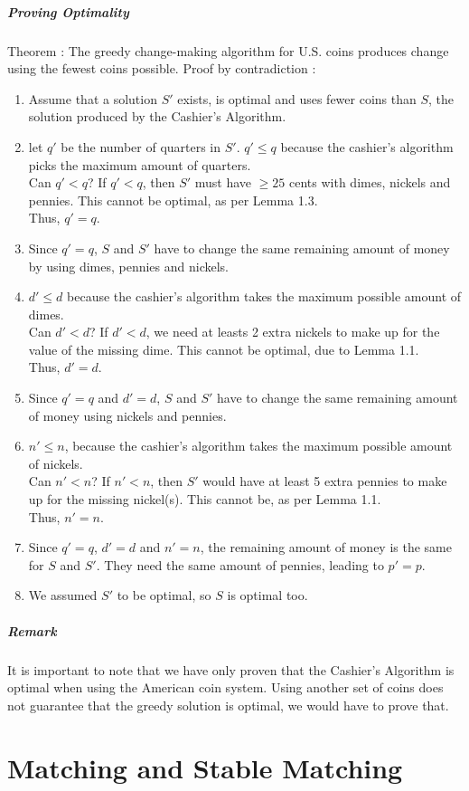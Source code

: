 \documentclass[10pt,a4paper]{book}
\begin{document}
\subparagraph*{Proving Optimality}
Theorem : The greedy change-making algorithm for U.S. coins produces change using the fewest coins possible.
Proof by contradiction :
\begin{enumerate}
\item Assume that a solution $S'$ exists, is optimal and uses fewer coins than $S$, the solution produced by the Cashier's Algorithm.
\item let $q'$ be the number of quarters in $S'$. $q' \leqslant q$ because the cashier's algorithm picks the maximum amount of quarters.\\
Can $q' < q$? If $q' < q$, then $S'$ must have $\geqslant 25$ cents with dimes, nickels and pennies. This cannot be optimal, as per Lemma 1.3.\\
Thus, $q' = q$.
\item Since $q' = q$, $S$ and $S'$ have to change the same remaining amount of money by using dimes, pennies and nickels.
\item $d' \leqslant d$ because the cashier's algorithm takes the maximum possible amount of dimes.\\
Can $d' < d$? If $d' < d$, we need at leasts 2 extra nickels to make up for the value of the missing dime. This cannot be optimal, due to Lemma 1.1.\\
Thus, $d' = d$.
\item Since $q' = q$ and $d' = d$, $S$ and $S'$ have to change the same remaining amount of money using nickels and pennies.
\item $n' \leqslant n$, because the cashier's algorithm takes the maximum possible amount of nickels.\\
Can $n' < n$? If $n' < n$, then $S'$ would have at least 5 extra pennies to make up for the missing nickel(s). This cannot be, as per Lemma 1.1.\\
Thus, $n' = n$.
\item Since $q' = q$, $d' = d$ and $n' = n$, the remaining amount of money is the same for $S$ and $S'$. They need the same amount of pennies, leading to $p' = p$.
\item We assumed $S'$ to be optimal, so $S$ is optimal too.
\end{enumerate}
\subparagraph*{Remark}
It is important to note that we have only proven that the Cashier's Algorithm is optimal when using the American coin system. Using another set of coins does not guarantee that the greedy solution is optimal, we would have to prove that. 

\section{Matching and Stable Matching}
\end{document}
